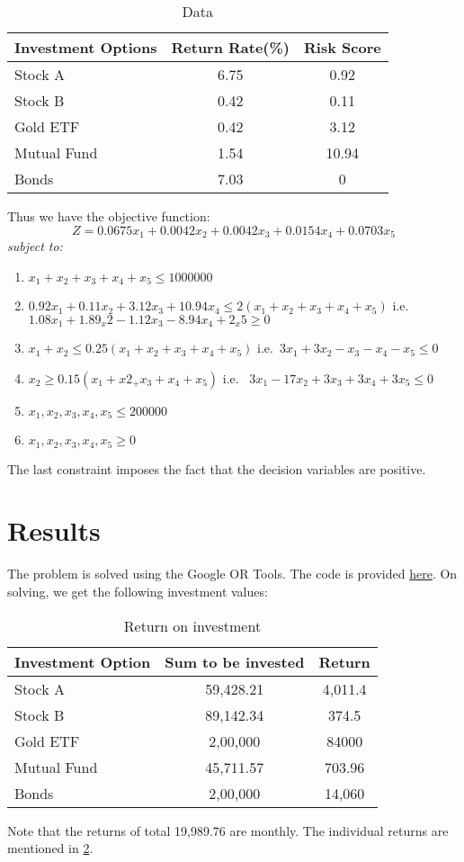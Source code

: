 \documentclass{article}
\begin{document}
\begin{table}[H]
    \centering
    \begin{tabular}{|l|c|c|} \hline 
         Investment Options&  Return Rate(\%)& Risk Score\\ \hline 
         Stock A&  6.75& 0.92\\ \hline 
         Stock B&  0.42& 0.11\\ \hline 
         Gold ETF&  0.42& 3.12\\ \hline 
         Mutual Fund&  1.54& 10.94\\ \hline 
         Bonds&  7.03& 0\\ \hline
    \end{tabular}
    \caption{Data}
    \label{tab:table1}
\end{table}
\newpage
Thus we have the objective function:
\[
Z=0.0675x_1 +0.0042x_2+0.0042x_3+0.0154x_4+0.0703x_5
\]
\textit{subject to:}
\begin{enumerate}[label=\Roman*.]
    \item \(x_1 + x_2+ x_3 + x_4 + x_5\leq 1000000\)
    \item \( 0.92x_1 +0.11x_2+3.12x_3+10.94x_4\leq 2(x_1+x_2+x_3+x_4+x_5)\)\newline
    i.e. \(1.08x_1+1.89_x2-1.12x_3-8.94x_4+2_x5\geq0\)
    \item \(x_1+x_2\leq0.25(x_1+x_2+x_3+x_4+x_5)\)\newline
    i.e.\ \(3x_1+3x_2-x_3-x_4-x_5\leq0\)    
    \item \(x_2\geq0.15(x_1+x2_+x_3+x_4+x_5)\)\newline
    i.e. \ \(3x_1-17x_2+3x_3+3x_4+3x_5\leq0\)
    \item \( x_1,x_2,x_3,x_4,x_5\leq200000\)
    \item \( x_1,x_2,x_3,x_4,x_5\geq0\)
\end{enumerate}
The last constraint imposes the fact that the decision variables are positive.
\section{Results}
The problem is solved using the Google OR Tools. The code is provided \href{https://github.com/KML1729/Project2024/blob/main/lpsolver.py}{here}. On solving, we get the following investment values:

\begin{table}[H]
    \centering
    \begin{tabular}{|l|c|c|} \hline 
         Investment Option&  Sum to be invested& Return\\ \hline 
         Stock A&  59,428.21& 4,011.4\\ \hline 
         Stock B&  89,142.34& 374.5\\ \hline 
         Gold ETF&  2,00,000& 84000\\ \hline 
         Mutual Fund&  45,711.57& 703.96\\ \hline 
         Bonds&  2,00,000& 14,060\\ \hline
    \end{tabular}
    \caption{Return on investment}
    \label{tab:table2}
\end{table}
Note that the returns of total 19,989.76 are monthly. The individual returns are mentioned in \ref{tab:table2}. 
\end{document}
